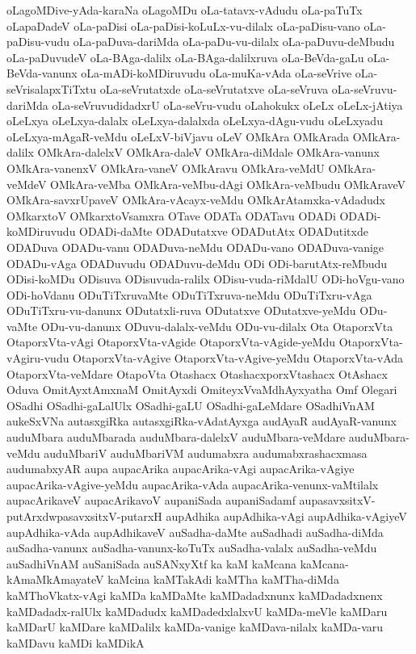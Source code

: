 {oLagoMDive-yAda-karaNa
oLagoMDu
oLa-tatavx-vAdudu
oLa-paTuTx
oLapaDadeV
oLa-paDisi
oLa-paDisi-koLuLx-vu-dilalx
oLa-paDisu-vano
oLa-paDisu-vudu
oLa-paDuva-dariMda
oLa-paDu-vu-dilalx
oLa-paDuvu-deMbudu
oLa-paDuvudeV
oLa-BAga-dalilx
oLa-BAga-dalilxruva
oLa-BeVda-gaLu
oLa-BeVda-vanunx
oLa-mADi-koMDiruvudu
oLa-muKa-vAda
oLa-seVrive
oLa-seVrisalapxTiTxtu
oLa-seVrutatxde
oLa-seVrutatxve
oLa-seVruva
oLa-seVruvu-dariMda
oLa-seVruvudidadxrU
oLa-seVru-vudu
oLahokukx
oLeLx
oLeLx-jAtiya
oLeLxya
oLeLxya-dalalx
oLeLxya-dalalxda
oLeLxya-dAgu-vudu
oLeLxyadu
oLeLxya-mAgaR-veMdu
oLeLxV-biVjavu
oLeV
OMkAra
OMkArada
OMkAra-dalilx
OMkAra-dalelxV
OMkAra-daleV
OMkAra-diMdale
OMkAra-vanunx
OMkAra-vanenxV
OMkAra-vaneV
OMkAravu
OMkAra-veMdU
OMkAra-veMdeV
OMkAra-veMba
OMkAra-veMbu-dAgi
OMkAra-veMbudu
OMkAraveV
OMkAra-savxrUpaveV
OMkAra-vAcayx-veMdu
OMkArAtamxka-vAdadudx
OMkarxtoV
OMkarxtoVsamxra
OTave
ODATa
ODATavu
ODADi
ODADi-koMDiruvudu
ODADi-daMte
ODADutatxve
ODADutAtx
ODADutitxde
ODADuva
ODADu-vanu
ODADuva-neMdu
ODADu-vano
ODADuva-vanige
ODADu-vAga
ODADuvudu
ODADuvu-deMdu
ODi
ODi-barutAtx-reMbudu
ODisi-koMDu
ODisuva
ODisuvuda-ralilx
ODisu-vuda-riMdalU
ODi-hoVgu-vano
ODi-hoVdanu
ODuTiTxruvaMte
ODuTiTxruva-neMdu
ODuTiTxru-vAga
ODuTiTxru-vu-danunx
ODutatxli-ruva
ODutatxve
ODutatxve-yeMdu
ODu-vaMte
ODu-vu-danunx
ODuvu-dalalx-veMdu
ODu-vu-dilalx
Ota
OtaporxVta
OtaporxVta-vAgi
OtaporxVta-vAgide
OtaporxVta-vAgide-yeMdu
OtaporxVta-vAgiru-vudu
OtaporxVta-vAgive
OtaporxVta-vAgive-yeMdu
OtaporxVta-vAda
OtaporxVta-veMdare
OtapoVta
Otashacx
OtashacxporxVtashacx
OtAshacx
Oduva
OmitAyxtAmxnaM
OmitAyxdi
OmiteyxVvaMdhAyxyatha
Omf
Olegari
OSadhi
OSadhi-gaLalUlx
OSadhi-gaLU
OSadhi-gaLeMdare
OSadhiVnAM
aukeSxVNa
autasxgiRka
autasxgiRka-vAdatAyxga
audAyaR
audAyaR-vanunx
auduMbara
auduMbarada
auduMbara-dalelxV
auduMbara-veMdare
auduMbara-veMdu
auduMbariV
auduMbariVM
audumabxra
audumabxrashacxmasa
audumabxyAR
aupa
aupacArika
aupacArika-vAgi
aupacArika-vAgiye
aupacArika-vAgive-yeMdu
aupacArika-vAda
aupacArika-venunx-vaMtilalx
aupacArikaveV
aupacArikavoV
aupaniSada
aupaniSadamf
aupasavxsitxV-putArxdwpasavxsitxV-putarxH
aupAdhika
aupAdhika-vAgi
aupAdhika-vAgiyeV
aupAdhika-vAda
aupAdhikaveV
auSadha-daMte
auSadhadi
auSadha-diMda
auSadha-vanunx
auSadha-vanunx-koTuTx
auSadha-valalx
auSadha-veMdu
auSadhiVnAM
auSaniSada
auSANxyXtf
ka
kaM
kaMcana
kaMcana-kAmaMkAmayateV
kaMcina
kaMTakAdi
kaMTha
kaMTha-diMda
kaMThoVkatx-vAgi
kaMDa
kaMDaMte
kaMDadadxnunx
kaMDadadxnenx
kaMDadadx-ralUlx
kaMDadudx
kaMDadedxlalxvU
kaMDa-meVle
kaMDaru
kaMDarU
kaMDare
kaMDalilx
kaMDa-vanige
kaMDava-nilalx
kaMDa-varu
kaMDavu
kaMDi
kaMDikA
}
